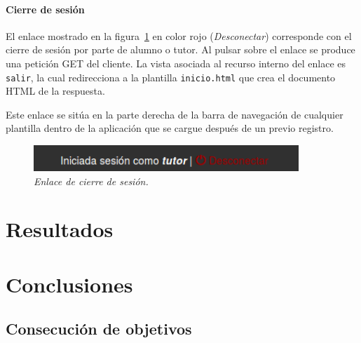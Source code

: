 \documentclass[a4paper, 12pt]{book}
\begin{document}
\subsubsection{Cierre de sesi\'on} 
\label{sec:cierresesion}
El enlace mostrado en la figura~\ref{fig:cierresesion} en color rojo (\textit{Desconectar}) corresponde con el cierre de sesi\'on por parte de alumno o 
tutor. Al pulsar sobre el enlace se produce una petici\'on GET del cliente. La vista asociada al recurso interno del enlace es \texttt{salir}, la cual 
redirecciona a la plantilla \texttt{inicio.html} que crea el documento HTML de la respuesta.

Este enlace se sit\'ua en la parte derecha de la barra de navegaci\'on de cualquier plantilla dentro de la aplicaci\'on que se cargue despu\'es de un previo
registro.
\begin{figure}
  \centering
  \includegraphics[width=10cm, keepaspectratio]{imagenes/CierreSesion}
  \caption{\textit{Enlace de cierre de sesi\'on.}}
  \label{fig:cierresesion}
\end{figure}



\cleardoublepage
\chapter{Resultados}





\cleardoublepage
\chapter{Conclusiones}
\label{chap:conclusiones}


\section{Consecuci\'on de objetivos}
\label{sec:consecucion-objetivos}
\end{document}
